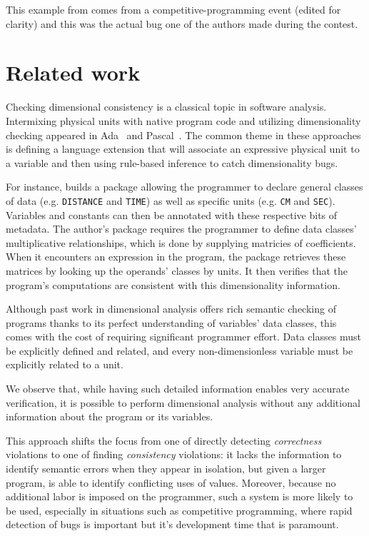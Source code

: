 \documentclass[12pt]{article}
\begin{document}
This example from  comes from a competitive-programming event (edited for clarity) and this was the actual bug one of the authors made during the contest. %

\section{Related work}

Checking dimensional consistency is a classical topic in software analysis. Intermixing physical units with native program code and utilizing dimensionality checking appeared in Ada~\cite{hilfinger1988ada} and Pascal~\cite{dreiheller1986programming, gehani1977units}. The common theme in these approaches is defining a language extension that will associate an expressive physical unit to a variable and then using rule-based inference to catch dimensionality bugs. 

For instance, \cite{hilfinger1988ada} builds a package allowing the programmer to declare general classes of data (e.g. \texttt{DISTANCE} and \texttt{TIME}) as well as specific units (e.g. \texttt{CM} and \texttt{SEC}). Variables and constants can then be annotated with these respective bits of metadata. The author's package requires the programmer to define data classes' multiplicative relationships, which is done by supplying matricies of coefficients.
When it encounters an expression in the program, the package retrieves these matrices by looking up the operands' classes by units. It then verifies that the program's computations are consistent with this dimensionality information.

Although past work in dimensional analysis offers rich semantic checking of programs thanks to its perfect understanding of variables' data classes, this comes with the cost of requiring significant programmer effort. Data classes must be explicitly defined and related, and every non-dimensionless variable must be explicitly related to a unit.

We observe that, while having such detailed information enables very accurate verification, it is possible to perform dimensional analysis without any additional information about the program or its variables.

This approach shifts the focus from one of directly detecting \textit{correctness} violations to one of finding \textit{consistency} violations: it lacks the information to identify semantic errors when they appear in isolation, but given a larger program, is able to identify conflicting uses of values. Moreover, because no additional labor is imposed on the programmer, such a system is more likely to be used, especially in situations such as competitive programming, where rapid detection of bugs is important but it's development time that is paramount.
\end{document}
